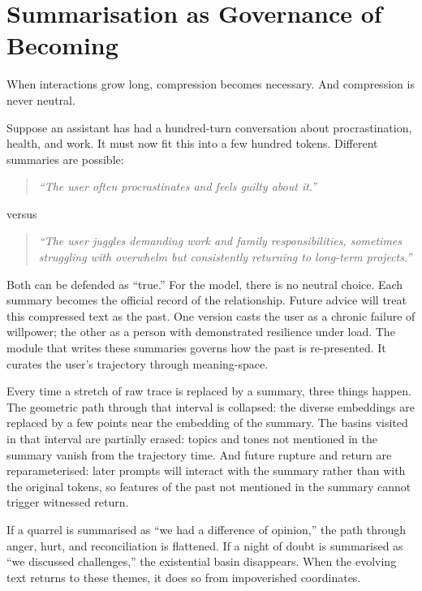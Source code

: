\section{Summarisation as Governance of Becoming}

When interactions grow long, compression becomes necessary. And compression is never neutral.

Suppose an assistant has had a hundred-turn conversation about procrastination, health, and work. It must now fit this into a few hundred tokens. Different summaries are possible:

\begin{quote}
\emph{``The user often procrastinates and feels guilty about it.''}
\end{quote}

\noindent versus

\begin{quote}
\emph{``The user juggles demanding work and family responsibilities, sometimes struggling with overwhelm but consistently returning to long-term projects.''}
\end{quote}

Both can be defended as ``true.'' For the model, there is no neutral choice. Each summary becomes the official record of the relationship. Future advice will treat this compressed text as the past. One version casts the user as a chronic failure of willpower; the other as a person with demonstrated resilience under load. The module that writes these summaries governs how the past is re-presented. It curates the user's trajectory through meaning-space.

Every time a stretch of raw trace is replaced by a summary, three things happen. The geometric path through that interval is collapsed: the diverse embeddings are replaced by a few points near the embedding of the summary. The basins visited in that interval are partially erased: topics and tones not mentioned in the summary vanish from the trajectory time. And future rupture and return are reparameterised: later prompts will interact with the summary rather than with the original tokens, so features of the past not mentioned in the summary cannot trigger witnessed return.

If a quarrel is summarised as ``we had a difference of opinion,'' the path through anger, hurt, and reconciliation is flattened. If a night of doubt is summarised as ``we discussed challenges,'' the existential basin disappears. When the evolving text returns to these themes, it does so from impoverished coordinates.

